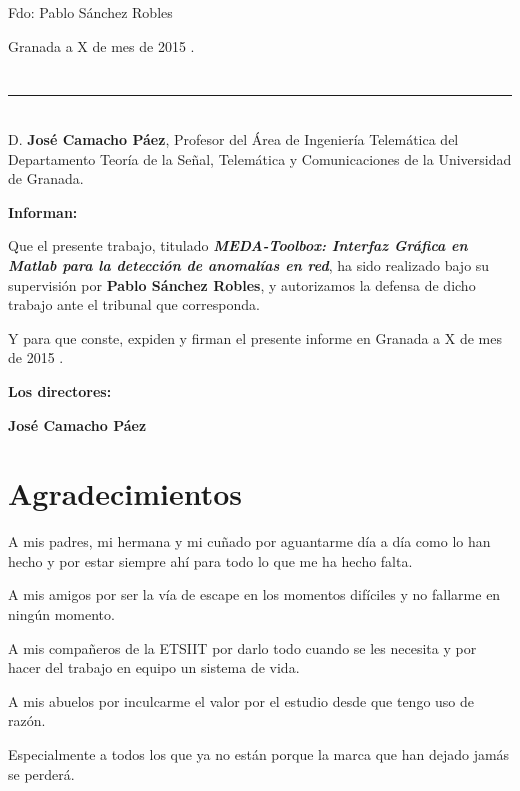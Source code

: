 \vspace{6cm}

\noindent Fdo: Pablo Sánchez Robles

\vspace{2cm}

\begin{flushright}
Granada a X de mes de 2015 .
\end{flushright}


\chapter*{}
\thispagestyle{empty}

\noindent\rule[-1ex]{\textwidth}{2pt}\\[4.5ex]

D. \textbf{José Camacho Páez}, Profesor del Área de Ingeniería Telemática del Departamento Teoría de la Señal, Telemática y Comunicaciones de la Universidad de Granada.

\vspace{0.5cm}

\vspace{0.5cm}

\textbf{Informan:}

\vspace{0.5cm}

Que el presente trabajo, titulado \textit{\textbf{MEDA-Toolbox: Interfaz Gráfica en Matlab para la detección de anomalías en red}},
ha sido realizado bajo su supervisión por \textbf{Pablo Sánchez Robles}, y autorizamos la defensa de dicho trabajo ante el tribunal
que corresponda.

\vspace{0.5cm}

Y para que conste, expiden y firman el presente informe en Granada a X de mes de 2015 .

\vspace{1cm}

\textbf{Los directores:}

\vspace{5cm}

\noindent \textbf{José Camacho Páez}

\chapter*{Agradecimientos}
\thispagestyle{empty}

       \vspace{1cm}


	A mis padres, mi hermana y mi cuñado por aguantarme día a día como lo han hecho y por estar siempre ahí para todo lo que me ha hecho falta.
	\bigskip
	
	A mis amigos por ser la vía de escape en los momentos difíciles y no fallarme en ningún momento.
	\bigskip
	
	A mis compañeros de la ETSIIT por darlo todo cuando se les necesita y por hacer del trabajo en equipo un sistema de vida.
	\bigskip
	
	A mis abuelos por inculcarme el valor por el estudio desde que tengo uso de razón.
	\bigskip
	
	Especialmente a todos los que ya no están porque la marca que han dejado jamás se perderá.
 

